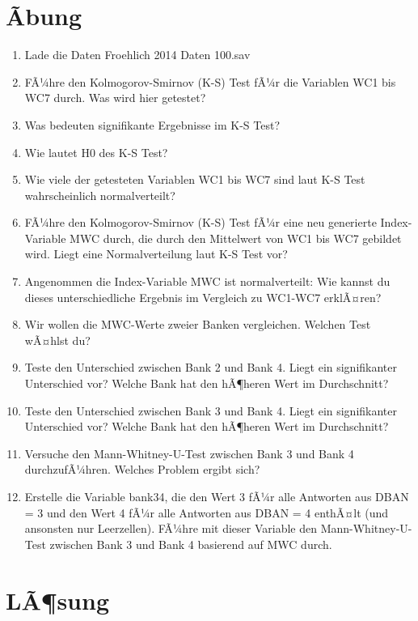 \documentclass[
]{book}
\begin{document}
\hypertarget{uxe3bung}{%
\section{Ãbung}\label{uxe3bung}}

\begin{enumerate}
\def\labelenumi{\arabic{enumi}.}
\item
  Lade die Daten Froehlich 2014 Daten 100.sav
\item
  FÃ¼hre den Kolmogorov-Smirnov (K-S) Test fÃ¼r die Variablen WC1 bis WC7 durch. Was wird hier getestet?
\item
  Was bedeuten signifikante Ergebnisse im K-S Test?
\item
  Wie lautet H0 des K-S Test?
\item
  Wie viele der getesteten Variablen WC1 bis WC7 sind laut K-S Test wahrscheinlich normalverteilt?
\item
  FÃ¼hre den Kolmogorov-Smirnov (K-S) Test fÃ¼r eine neu generierte Index-Variable MWC durch, die durch den Mittelwert von WC1 bis WC7 gebildet wird. Liegt eine Normalverteilung laut K-S Test vor?
\item
  Angenommen die Index-Variable MWC ist normalverteilt: Wie kannst du dieses unterschiedliche Ergebnis im Vergleich zu WC1-WC7 erklÃ¤ren?
\item
  Wir wollen die MWC-Werte zweier Banken vergleichen. Welchen Test wÃ¤hlst du?
\item
  Teste den Unterschied zwischen Bank 2 und Bank 4. Liegt ein signifikanter Unterschied vor? Welche Bank hat den hÃ¶heren Wert im Durchschnitt?
\item
  Teste den Unterschied zwischen Bank 3 und Bank 4. Liegt ein signifikanter Unterschied vor? Welche Bank hat den hÃ¶heren Wert im Durchschnitt?
\item
  Versuche den Mann-Whitney-U-Test zwischen Bank 3 und Bank 4 durchzufÃ¼hren. Welches Problem ergibt sich?
\item
  Erstelle die Variable bank34, die den Wert 3 fÃ¼r alle Antworten aus DBAN = 3 und den Wert 4 fÃ¼r alle Antworten aus DBAN = 4 enthÃ¤lt (und ansonsten nur Leerzellen). FÃ¼hre mit dieser Variable den Mann-Whitney-U-Test zwischen Bank 3 und Bank 4 basierend auf MWC durch.
\end{enumerate}

\hypertarget{luxe3sung}{%
\section{LÃ¶sung}\label{luxe3sung}}
\end{document}
